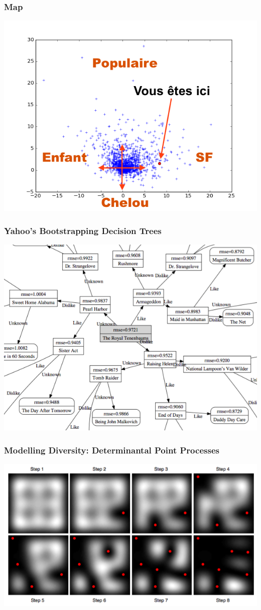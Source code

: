 \documentclass[handout]{beamer}
\begin{document}
\begin{frame}
	\frametitle{Map}
	\includegraphics[width=\linewidth]{figures/here.png}
\end{frame}

\begin{frame}
	\frametitle{Yahoo's Bootstrapping Decision Trees}
	\includegraphics[width=\linewidth]{figures/decisiontree.png}
\end{frame}

\begin{frame}
    \frametitle{Modelling Diversity: Determinantal Point Processes}
    \includegraphics[width=\linewidth]{figures/dpp.png}
\end{frame}
\end{document}
